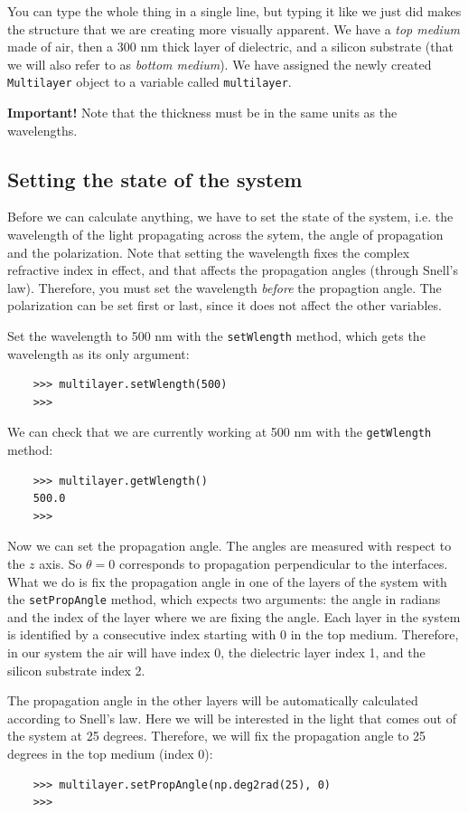 \documentclass[a4paper,11pt,aps,final]{revtex4}
\begin{document}
You can type the whole thing in a single line, but typing it like we just did makes the structure that we are creating more visually apparent. We have a \emph{top medium} made of air, then a 300 nm thick layer of dielectric, and a silicon substrate (that we will also refer to as \emph{bottom medium}). We have assigned the newly created \texttt{Multilayer} object to a variable called \texttt{multilayer}.

\textbf{Important!} Note that the thickness must be in the same units as the wavelengths.

\subsection{Setting the state of the system}
Before we can calculate anything, we have to set the state of the system, i.e. the wavelength of the light propagating across the sytem, the angle of propagation and the polarization. Note that setting the wavelength fixes the complex refractive index in effect, and that affects the propagation angles (through Snell's law). Therefore, you must set the wavelength \emph{before} the propagtion angle. The polarization can be set first or last, since it does not affect the other variables.

Set the wavelength to 500 nm with the \texttt{setWlength} method, which gets the wavelength as its only argument:
\begin{verbatim}
    >>> multilayer.setWlength(500)
    >>>
\end{verbatim}

We can check that we are currently working at 500 nm with the \texttt{getWlength} method:
\begin{verbatim}
    >>> multilayer.getWlength()
    500.0
    >>>
\end{verbatim}

Now we can set the propagation angle. The angles are measured with respect to the $z$ axis. So $\theta = 0$ corresponds to propagation perpendicular to the interfaces. What we do is fix the propagation angle in one of the layers of the system with the \texttt{setPropAngle} method, which expects two arguments: the angle in radians and the index of the layer where we are fixing the angle. Each layer in the system is identified by a consecutive index starting with 0 in the top medium. Therefore, in our system the air will have index 0, the dielectric layer index 1, and the silicon substrate index 2.

The propagation angle in the other layers will be automatically calculated according to Snell's law. Here we will be interested in the light that comes out of the system at 25 degrees. Therefore, we will fix the propagation angle to 25 degrees in the top medium (index 0):
\begin{verbatim}
    >>> multilayer.setPropAngle(np.deg2rad(25), 0)
    >>>
\end{verbatim}
\end{document}
